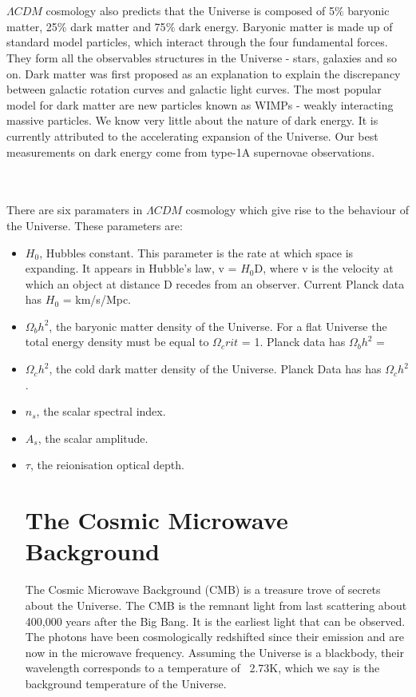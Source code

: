 \documentclass[12pt]{report}
\begin{document}
\begin{itemize}
\\\\$\Lambda CDM$ cosmology also predicts that the Universe is composed of 5$\%$ baryonic matter, 25$\%$ dark matter and 75$\%$ dark energy. Baryonic matter is made up of standard model particles, which interact through the four fundamental forces. They form all the observables structures in the Universe - stars, galaxies and so on. Dark matter was first proposed as an explanation to explain the discrepancy between galactic rotation curves and galactic light curves. The most popular model for dark matter are new particles known as WIMPs - weakly interacting massive particles. We know very little about the nature of dark energy. It is currently attributed to the accelerating expansion of the Universe. Our best measurements on dark energy come from type-1A supernovae observations.

\\\\There are six paramaters in $\Lambda CDM$ cosmology which give rise to the behaviour of the Universe. These parameters are:

\begin{itemize}
\item $H_0$, Hubbles constant. This parameter is the rate at which space is expanding. It appears in Hubble's law, v = $H_0$D, where v is the velocity at which an object at distance D recedes from an observer. Current Planck data has $H_0$ = km/s/Mpc.
\item $\Omega_b h^2$, the baryonic matter density of the Universe. For a flat Universe the total energy density must be equal to $\Omega_crit$ = 1. Planck data has $\Omega_b h^2$ = 
\item $\Omega_c h^2$, the cold dark matter density of the Universe. Planck Data has has $\Omega_c h^2$. 
\item $n_s$, the scalar spectral index.
\item $A_s$, the scalar amplitude.
\item $\tau$, the reionisation optical depth.

\section{The Cosmic Microwave Background}
The Cosmic Microwave Background (CMB) is a treasure trove of secrets about the Universe. The CMB is the remnant light from last scattering about 400,000 years after the Big Bang. It is the earliest light that can be observed. The photons have been cosmologically redshifted since their emission and are now in the microwave frequency. Assuming the Universe is a blackbody, their wavelength corresponds to a temperature of ~2.73K, which we say is the background temperature of the Universe.


\end{itemize}
\end{itemize}
\end{document}
